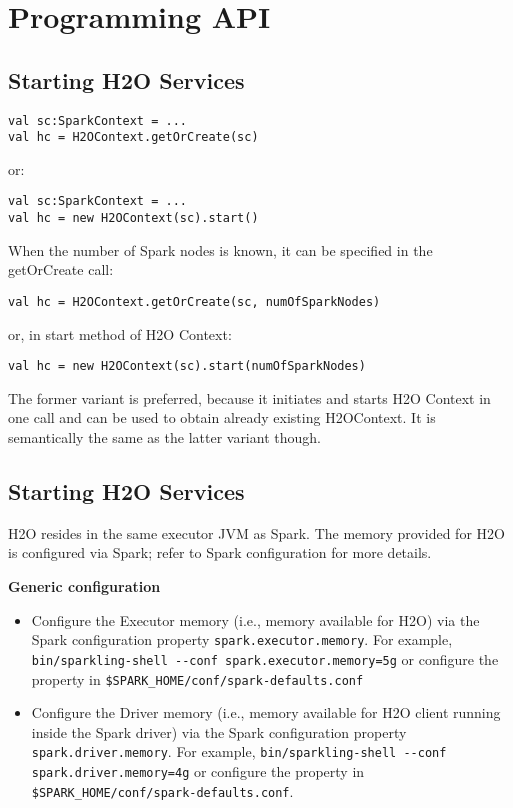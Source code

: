 \section{Programming API}

\subsection{Starting H2O Services}

\begin{lstlisting}[style=Scala]
val sc:SparkContext = ...
val hc = H2OContext.getOrCreate(sc)
\end{lstlisting}

or:
\begin{lstlisting}[style=Scala]
val sc:SparkContext = ...
val hc = new H2OContext(sc).start()
\end{lstlisting}

When the number of Spark nodes is known, it can be specified in the getOrCreate call:

\begin{lstlisting}[style=Scala]
val hc = H2OContext.getOrCreate(sc, numOfSparkNodes)
\end{lstlisting}

or, in start method of H2O Context:

\begin{lstlisting}[style=Scala]
val hc = new H2OContext(sc).start(numOfSparkNodes)
\end{lstlisting}

The former variant is preferred, because it initiates and starts H2O Context in one call and can be used to obtain already existing H2OContext. It is semantically the same as the latter variant though.

\subsection{Starting H2O Services}

H2O resides in the same executor JVM as Spark. The memory provided for H2O is configured via Spark; refer to Spark configuration for more details.

\textbf{Generic configuration}

\begin{itemize}
\item Configure the Executor memory (i.e., memory available for H2O) via the Spark configuration property \texttt{spark.executor.memory}. For example, {\lstinline[style=Bash]|bin/sparkling-shell --conf spark.executor.memory=5g|} or configure the property in {\lstinline[style=Bash]|$SPARK_HOME/conf/spark-defaults.conf|}
\item Configure the Driver memory (i.e., memory available for H2O client running inside the Spark driver) via the Spark configuration property \texttt{spark.driver.memory}. For example, {\lstinline[style=Bash]|bin/sparkling-shell --conf spark.driver.memory=4g|} or configure the property in {\lstinline[style=Bash]|$SPARK_HOME/conf/spark-defaults.conf|}.
\end{itemize}

